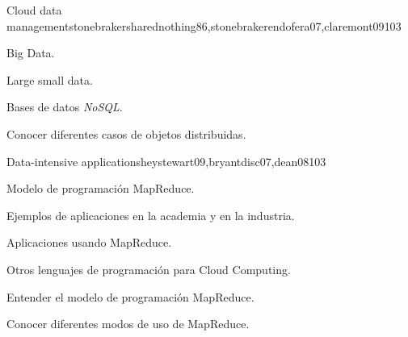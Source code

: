 \begin{syllabus}
\begin{unit}{Cloud data management}{stonebrakersharednothing86,stonebrakerendofera07,claremont09}{10}{3}
   \begin{topics}
      \item \IMInformationModelsTopicInformationStorage%
      \item \IMInformationModelsTopicSearch%
      \item \IMInformationModelsTopicScalability%
      \item \IMDatabaseSystemsTopicDatabase%
      \item \IMDistributedDatabasesAllTopics%
      \item Big Data.
      \item Large small data.
      \item Bases de datos {\it NoSQL}.
   \end{topics}

    \begin{learningoutcomes}
      \item \IMInformationModelsObjTWO%
      \item \IMInformationModelsObjSEVEN%
      \item \IMInformationModelsObjEIGHT%
      \item \IMInformationModelsObjNINE%
      \item \IMDistributedDatabasesObjTWO%
      \item Conocer diferentes casos de objetos distribuidas.
   \end{learningoutcomes}
\end{unit}


\begin{unit}{Data-intensive applications}{heystewart09,bryantdisc07,dean08}{10}{3}
    \begin{topics}
      \item Modelo de programación MapReduce.
      \item Ejemplos de aplicaciones en la academia y en la industria.
      \item Aplicaciones usando MapReduce.
      \item Otros lenguajes de programación para Cloud Computing.
   \end{topics}

   \begin{learningoutcomes}
      \item Entender el modelo de programación MapReduce.
      \item Conocer diferentes modos de uso de MapReduce. 
      \item \IMInformationModelsObjEIGHT%
      \item \IMInformationModelsObjNINE%
      \item \IMDistributedDatabasesObjTWO%
   \end{learningoutcomes}
\end{unit}



\end{syllabus}
